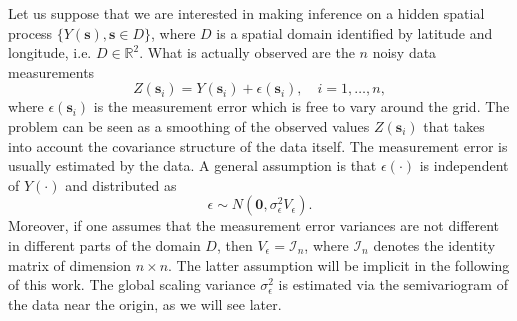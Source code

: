 \documentclass[11pt]{article}
\begin{document}
Let us suppose that we are interested in making inference on a hidden spatial process $\{Y(\bm{s}), \bm{s} \in D \}$, where $D$ is a spatial domain identified by latitude and longitude, i.e. $D \in \mathbb{R}^2$. What is actually observed are the $n$ noisy data measurements
\begin{equation}
Z(\bm{s}_i) = Y(\bm{s}_i) + \epsilon(\bm{s}_i), \quad i = 1, \dots, n,
\label{eq:hier1}
\end{equation}
where $\epsilon(\bm{s}_i)$ is the measurement error which is free to vary around the grid. The problem can be seen as a smoothing of the observed values $Z(\bm{s}_i)$ that takes into account the covariance structure of the data itself. The measurement error is usually estimated by the data. A general assumption is that $\epsilon(\cdot)$ is independent of $Y(\cdot)$ and distributed as $$\epsilon \sim N (\bm{0}, \sigma_\epsilon^2 V_\epsilon).$$
Moreover, if one assumes that the measurement error variances are not different in different parts of the domain $D$, then $V_\epsilon = \mathcal{I}_n$, where $\mathcal{I}_n$ denotes the identity matrix of dimension $n \times n$. The latter assumption will be implicit in the following of this work. The global scaling variance $\sigma_\epsilon^2$ is estimated via the semivariogram of the data near the origin, as we will see later.\\
\end{document}
